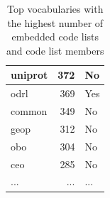 \begin{table}[h]
\begin{tabular}{|l|r|l|}
uniprot        & 372  & No  \\ \hline
odrl           & 369  & Yes \\ \hline
common         & 349  & No  \\ \hline
geop           & 312  & No  \\ \hline
obo            & 304  & No  \\ \hline
ceo            & 285  & No  \\ \hline
...            & ...  & ... \\ \hline
\end{tabular}
\centering
\caption{Top vocabularies with the highest number of embedded code lists and code list members} %
\label{tab:top-codes} 
\end{table}

